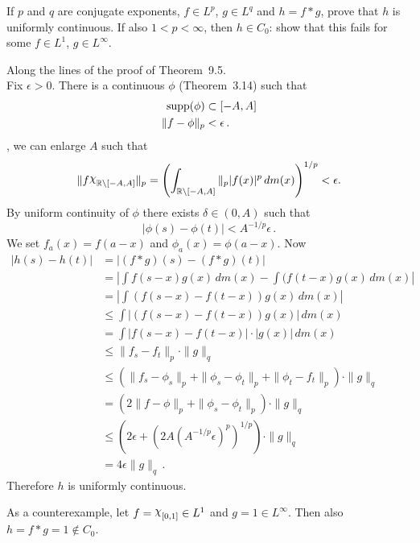 \begin{enumerate}
\begin{excopy}
If $p$ and $q$ are conjugate exponents, 
\(f\in L^p\), \(g\in L^q\) and \(h = f\ast g\),
prove that $h$ is uniformly continuous. If also \(1<p<\infty\), then
\(h\in C_0\): show that this fails for some \(f\in L^1\), \(g\in L^\infty\).
\end{excopy}

Along the lines of the proof of Theorem~9.5.\\
Fix \(\epsilon > 0\). There is a continuous \(\phi\) (Theorem~3.14) such that
\begin{align*}
\mathop{\rm supp}\nolimits(\phi) &\subset [-A,A] \\
\|f-\phi\|_p &< \epsilon\,.
\end{align*}
\Wlogy, we can enlarge $A$ such that 
\begin{equation*}
\|f\chhi_{\R\setminus[-A,A]}\|_p
= \left(\int_{\R\setminus[-A,A]}\|_p |f(x)|^p\,dm(x)\right)^{1/p} < \epsilon.
\end{equation*}
By uniform continuity of \(\phi\) there exists \(\delta\in (0, A)\)
such that 
\begin{equation*}
 |\phi(s) - \phi(t)| < A^{-1/p}\epsilon\,.
\end{equation*}
We set 
\(f_a(x) = f(a-x)\) and
\(\phi_a(x) = \phi(a-x)\).
Now
\begin{align*}
|h(s)-h(t)|
&= |(f\ast g)(s) - (f\ast g)(t)| \\
&= \left|\int f(s-x)g(x)\,dm(x) - \int (f(t-x)g(x)\,dm(x) \right| \\
&= \left|\int (f(s-x) - f(t-x))g(x)\,dm(x) \right| \\
&\leq \int |(f(s-x) - f(t-x))g(x)|\,dm(x)  \\
&= \int \left|f(s-x) - f(t-x)\right|\cdot|g(x)|\,dm(x) \\
&\leq \|f_s - f_t\|_p \cdot \|g\|_q \\
&\leq \left(
           \|f_s - \phi_s\|_p + \|\phi_s - \phi_t\|_p +\|\phi_t - f_t\|_p 
     \right) \cdot \|g\|_q \\
&= \left(2\|f - \phi\|_p + \|\phi_s - \phi_t\|_p \right) \cdot \|g\|_q \\
&\leq (2\epsilon + (2A (A^{-1/p}\epsilon)^p)^{1/p}) \cdot \|g\|_q \\
&= 4\epsilon \|g\|_q\,.
\end{align*}
Therefore $h$ is uniformly continuous.

As a counterexample, let \(f = \chhi_{[0,1]} \in L^1\)
and \(g = 1 \in L^\infty\). Then also \(h = f \ast g = 1 \notin C_0\).



\end{enumerate}
